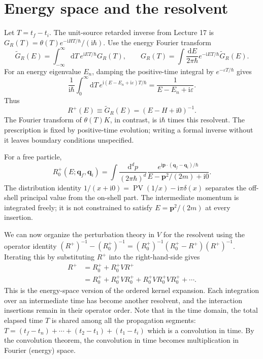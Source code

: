 \documentclass[11pt]{article}
\newcommand{\dd}{\mathrm d}
\newcommand{\ii}{\mathrm i}
\newcommand{\module}[1]{\clearpage\section{#1}}
\begin{document}
\module{Energy space and the resolvent}
Let \(T=t_f-t_i\). The unit-source retarded inverse from Lecture 17 is
\(G_R(T)=\theta(T)e^{-\ii HT/\hbar}/(\ii\hbar)\).
Use the energy Fourier transform
\begin{equation}
 \widetilde G_R(E)=\int_{-\infty}^{\infty}\dd T\,
 e^{\ii ET/\hbar}G_R(T),\qquad
 G_R(T)=\int\frac{\dd E}{2\pi\hbar}
 e^{-\ii ET/\hbar}\widetilde G_R(E).
\end{equation}
For an energy eigenvalue \(E_n\), damping the positive-time integral
by \(e^{-\varepsilon T/\hbar}\) gives
\begin{equation}
 \frac1{\ii\hbar}\int_0^\infty\dd T\,
 e^{\ii(E-E_n+\ii\varepsilon)T/\hbar}
 =\frac1{E-E_n+\ii\varepsilon}.
\end{equation}
Thus
\begin{equation}
 R^+(E)\equiv\widetilde G_R(E)=(E-H+\ii0)^{-1}.        \label{eq:resolvent}
\end{equation}
The Fourier transform of \(\theta(T)K\), in contrast, is \(\ii\hbar\)
times this resolvent. The prescription is fixed by positive-time
evolution; writing a formal inverse without it leaves boundary
conditions unspecified.

For a free particle,
\begin{equation}
 R_0^+(E;\bm q_f,\bm q_i)=\int\frac{\dd^d p}{(2\pi\hbar)^d}
 \frac{e^{\ii\bm p\cdot(\bm q_f-\bm q_i)/\hbar}}
 {E-\bm p^2/(2m)+\ii0}.
\end{equation}
The distribution identity
\(1/(x+\ii0)=\operatorname{PV}(1/x)-\ii\pi\delta(x)\)
separates the off-shell principal value from the on-shell part.
The intermediate momentum is integrated freely; it is not constrained
to satisfy \(E=\bm p^2/(2m)\) at every insertion.

We can now organize the perturbation theory in $V$ for the resolvent using the operator identity $(R^+)^{-1}-(R^+_0)^{-1}=(R^+_0)^{-1}(R^+_0-R^+)(R^+)^{-1}$. Iterating this by substituting $R^+$ into the right-hand-side gives
\begin{align}
 R^+&=R_0^++R_0^+VR^+\\
 &=R_0^++R_0^+VR_0^++R_0^+VR_0^+VR_0^++\cdots.
                                                        \label{eq:resborn}
\end{align}
This is the energy-space version of the ordered kernel expansion.
Each integration over an intermediate time has become another
resolvent, and the interaction insertions remain in their operator order.
Note that in the time domain, the total elapsed time $T$ is shared among all the propagation segments: $T=(t_f-t_n)+\cdots+(t_2-t_1)+(t_1-t_i)$ which is a convolution in time. By the convolution theorem, the convolution in time becomes multiplication in Fourier (energy) space.
\end{document}
